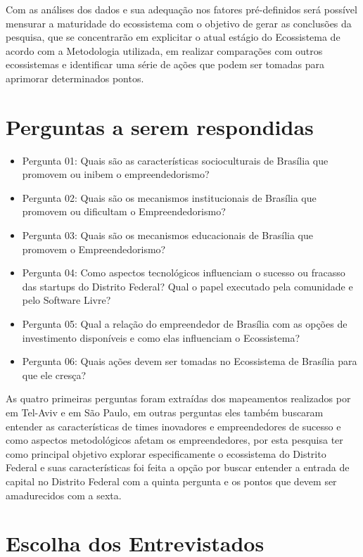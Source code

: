 Com as análises dos dados e sua adequação nos fatores pré-definidos será possível mensurar a maturidade do ecossistema com o objetivo de gerar as conclusões da pesquisa, que se concentrarão em explicitar o atual estágio do Ecossistema de acordo com a Metodologia utilizada, em realizar comparações com outros ecossistemas e identificar uma série de ações que podem ser tomadas para aprimorar determinados pontos.

\section{Perguntas a serem respondidas}
\label{subsection:questoes_de_pesquisa}

\begin{itemize}
  \item Pergunta 01: Quais são as características socioculturais de Brasília que promovem ou inibem o empreendedorismo?
  \item Pergunta 02: Quais são os mecanismos institucionais de Brasília que promovem ou dificultam o Empreendedorismo?
  \item Pergunta 03: Quais são os mecanismos educacionais de Brasília que promovem o Empreendedorismo?
  \item Pergunta 04: Como aspectos tecnológicos influenciam o sucesso ou fracasso das startups do Distrito Federal? Qual o papel executado pela comunidade e pelo Software Livre?
  \item Pergunta 05: Qual a relação do empreendedor de Brasília com as opções de investimento disponíveis e como elas influenciam o Ecossistema?
  \item Pergunta 06: Quais ações devem ser tomadas no Ecossistema de Brasília para que ele cresça?
\end{itemize}

As quatro primeiras perguntas foram extraídas dos mapeamentos realizados por  em Tel-Aviv e  em São Paulo, em outras perguntas eles também buscaram entender as características de times inovadores e empreendedores de sucesso e como aspectos metodológicos afetam os empreendedores, por esta pesquisa ter como principal objetivo explorar especificamente o ecossistema do Distrito Federal e suas características foi feita a opção por buscar entender a entrada de capital no Distrito Federal com a quinta pergunta e os pontos que devem ser amadurecidos com a sexta.

\section{Escolha dos Entrevistados}
\label{subsection:escolha_dos_entrevistados}

